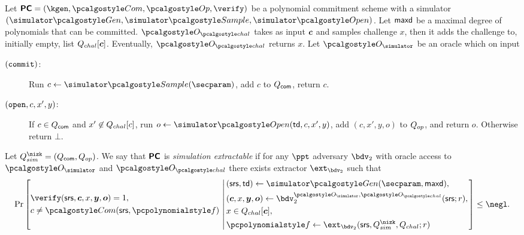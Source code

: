 \documentclass[runningheads,11pt]{llncs}
\let\spvec\vec
\let\vec\accentvec
\let\spvec\vec
\let\vec\spvec
\def\vec#1{\mathchoice{\mbox{\boldmath$\displaystyle#1$}}
  {\mbox{\boldmath$\textstyle#1$}} {\mbox{\boldmath$\scriptstyle#1$}}
  {\mbox{\boldmath$\scriptscriptstyle#1$}}}
\begin{document}
\begin{definition}
  \label{def:se_bdv2}
  Let $\PCOM = (\kgen, \com, \op, \verify)$ be a polynomial commitment scheme with a
  simulator $(\simgen, \simsample, \simopen)$. Let $\mathsf{maxd}$ be a maximal degree of
  polynomials that can be committed.  $\oraclec$ takes as input $\vec{c}$ and samples
  challenge $x$, then it adds the challenge to, initially empty, list
  $\Qchal[\vec{c}]$. Eventually, $\oraclec$ returns $x$. Let $\oracles$ be an oracle
  which on input
     \begin{description}
     \item[$(\mathtt{commit})$:] Run $c \gets \simsample (\secparam)$, add $c$ to
       $Q_{\mathsf{com}}$, return $c$.
     \item[$(\mathtt{open}, c, x', y)$:] If $c \in Q_{\mathsf{com}}$ and $x' \not\in {Q_{chal}}[c]$, run
       $o \gets \simopen(\td, c, x', y)$, add $(c, x', y, o)$ to $Q_{op}$, and return
       $o$. Otherwise return $\bot$.
     \end{description}
     Let $\Qsim = (\Qcom, \Qop)$.  We say that $\bm{\mathsf{PC}}$ is \emph{simulation
       extractable} if for any $\ppt$ adversary $\bdv_2$ with oracle access to
     $\oracles$ and $\oraclec$ there exists extractor $\ext_{\bdv_2}$ such that
     \[
       \Pr \left[
         \begin{aligned}
           & \verify(\srs, \vec{c}, x, \vec{y}, \vec{o}) = 1, \\
           & c \neq \com(\srs, \p{f})\\
         \end{aligned}
         \,\left|\, \vphantom{
             \begin{aligned}
               & \\
               & \\
               & \\
               &
             \end{aligned}
           }
           \begin{aligned}
             & (\srs, \td) \gets \simgen(\secparam, \maxdeg),\\
             & (\vec{c}, x, \vec{y}, \vec{o}) \gets \bdv_2^{\oracles,\oraclec}(\srs; r), \\
             & x \in \Qchal [\vec{c}], \\
             & \p{f} \gets \ext_{\bdv_2}(\srs, \Qsim, \Qchal; r)
           \end{aligned}
         \right.\right] \leq \negl.
\]
\end{definition}
\end{document}
